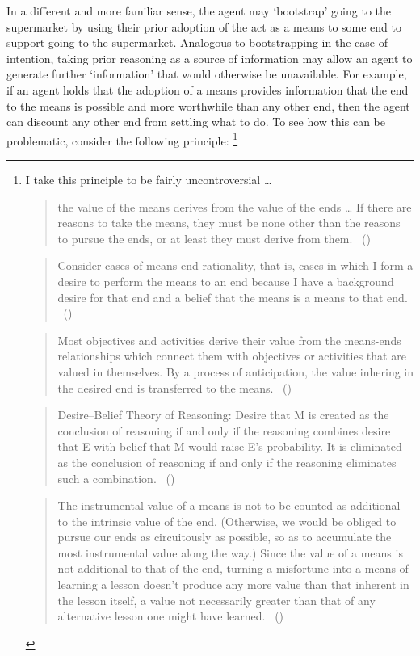 \documentclass[10pt]{article}
\begin{document}
In a different and more familiar sense, the agent may `bootstrap' going to the supermarket by using their prior adoption of the act as a means to some end to support going to the supermarket.
Analogous to bootstrapping in the case of intention, taking prior reasoning as a source of information may allow an agent to generate further `information' that would otherwise be unavailable.
For example, if an agent holds that the adoption of a means provides information that the end to the means is possible and more worthwhile than any other end, then the agent can discount any other end from settling what to do.
To see how this can be problematic, consider the following principle:\nolinebreak
\footnote{I take this principle to be fairly uncontroversial \dots
  \begin{quote}
    the value of the means derives from the value of the ends \dots
    If there are reasons to take the means, they must be none other than the reasons to pursue the ends, or at least they must derive from them.\nolinebreak
  \mbox{ }\hfill(\cite[2]{Raz:2005aa})
\end{quote}

\begin{quote}
  Consider cases of means-end rationality, that is, cases in which I form a desire to perform the means to an end because I have a background desire for that end and a belief that the means is a means to that end.\nolinebreak
  \mbox{ }\hfill(\cite[84]{Smith:2004aa})
\end{quote}

\begin{quote}
  Most objectives and activities derive their value from the means-ends relationships which connect them with objectives or activities that are valued in themselves.
  By a process of anticipation, the value inhering in the desired end is transferred to the means.\nolinebreak
  \mbox{ }\hfill(\cite[61]{Simon:1997aa})
\end{quote}

\begin{quote}
  Desire–Belief Theory of Reasoning: Desire that M is created as the conclusion of reasoning if and only if the reasoning combines desire that E with belief that M would raise E’s probability.
  It is eliminated as the conclusion of reasoning if and only if the reasoning eliminates such a combination.\nolinebreak
  \mbox{ }\hfill(\cite[2]{Sinhababu:2017aa})
\end{quote}

\begin{quote}
  The instrumental value of a means is not to be counted as additional to the intrinsic value of the end.
  (Otherwise, we would be obliged to pursue our ends as circuitously as possible, so as to accumulate the most instrumental value along the way.)
  Since the value of a means is not additional to that of the end, turning a misfortune into a means of learning a lesson doesn’t produce any more value than that inherent in the lesson itself, a value not necessarily greater than that of any alternative lesson one might have learned.\nolinebreak
  \mbox{ }\hfill(\cite[65]{Velleman:2000ab})
\end{quote}

}
\end{document}
